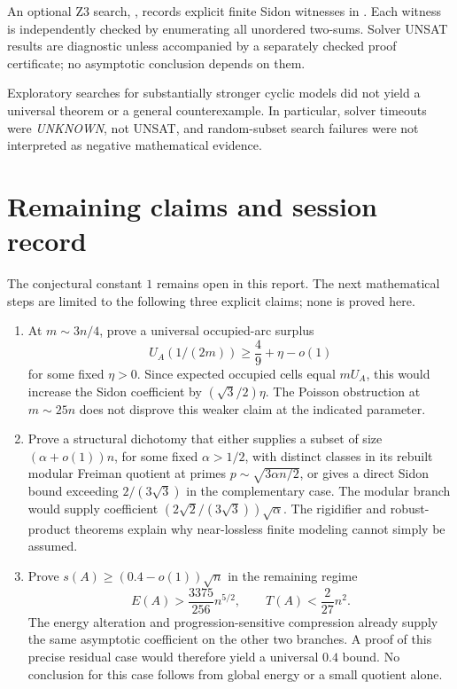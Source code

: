 \documentclass[11pt]{article}
\theoremstyle{definition}
\theoremstyle{remark}
\begin{document}
An optional Z3 search, ,
records explicit finite Sidon witnesses in
. Each witness is
independently checked by enumerating all unordered two-sums. Solver
UNSAT results are diagnostic unless accompanied by a separately checked
proof certificate; no asymptotic conclusion depends on them.

Exploratory searches for substantially stronger cyclic models did not
yield a universal theorem or a general counterexample. In particular, solver timeouts were
\emph{UNKNOWN}, not UNSAT, and random-subset search failures were not
interpreted as negative mathematical evidence.

\section{Remaining claims and session record}

The conjectural constant $1$ remains open in this report. The next
mathematical steps are limited to the following three explicit claims;
none is proved here.
\begin{enumerate}
\item At $m\sim3n/4$, prove a universal occupied-arc surplus
\[
U_A(1/(2m))\ge\frac49+\eta-o(1)
\]
for some fixed $\eta>0$. Since expected occupied cells equal $mU_A$,
this would increase the Sidon coefficient by $(\sqrt3/2)\eta$.
The Poisson obstruction at $m\sim25n$ does not disprove this weaker
claim at the indicated parameter.
\item Prove a structural dichotomy that either supplies a subset of
size $(\alpha+o(1))n$, for some fixed $\alpha>1/2$, with distinct
classes in its rebuilt modular Freiman quotient at primes
$p\sim\sqrt{3\alpha n/2}$, or gives a direct Sidon bound exceeding
$2/(3\sqrt3)$ in the complementary case. The modular branch would
supply coefficient $(2\sqrt2/(3\sqrt3))\sqrt\alpha$.
The rigidifier and robust-product theorems explain why near-lossless
finite modeling cannot simply be assumed.
\item Prove $s(A)\ge(0.4-o(1))\sqrt n$ in the remaining regime
\[
E(A)>\frac{3375}{256}n^{5/2},\qquad
T(A)<\frac{2}{27}n^2.
\]
The energy alteration and progression-sensitive compression already
supply the same asymptotic coefficient on the other two branches.
A proof of this precise residual case would therefore yield a
universal $0.4$ bound. No conclusion for this case follows from global
energy or a small quotient alone.
\end{enumerate}
\end{document}
